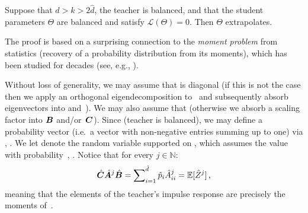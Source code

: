 \begin{lemma}\label{lemma:exact_extrapolation}
Suppose that $d > k > 2\hat{d}$, the teacher is balanced, and that the student parameters $\Theta$ are balanced and satisfy $\mathcal{L} ( \Theta ) = 0$. Then $\Theta$ extrapolates.
\end{lemma}
\begin{sproof}
The proof is based on a surprising connection to the \textit{moment problem} from statistics (recovery of a probability distribution from its moments), which has been studied for decades (see, e.g., \cite{schmudgen2017moment}). 

Without loss of generality, we may assume that \smash{$\hat{\mA}$} is diagonal (if this is not the case then we apply an orthogonal eigendecomposition to~\smash{$\hat{\mA}$} and subsequently absorb eigenvectors into \smash{$\hat{\mB}$} and~\smash{$\hat{\mC}$}).
We may also assume that  (otherwise we absorb a scaling factor into ${\bm{B}}$ and/or~${\bm{C}}$).
Since \smash{$\hat{\mC}^\top=\hat{\mB}$} (teacher is balanced), we may define a probability vector (i.e.~a vector with non-negative entries summing up to one)  via , .
We let  denote the random variable supported on , which assumes the value  with probability~, .
Notice that for every $j \in \mathbb{N}$:
\[
\hat{{\bm{C}}} \hat{{\bm{A}}}^j \hat{{\bm{B}}} = \sum\nolimits_{i=1}^{\hat{d}} \hat{p}_i \hat{{A}}_{i i} ^j = \mathbb{E}[\hat{Z}^j]
\text{\,,}
\]
meaning that the elements of the teacher's impulse response are precisely the moments of~.


\end{sproof}
